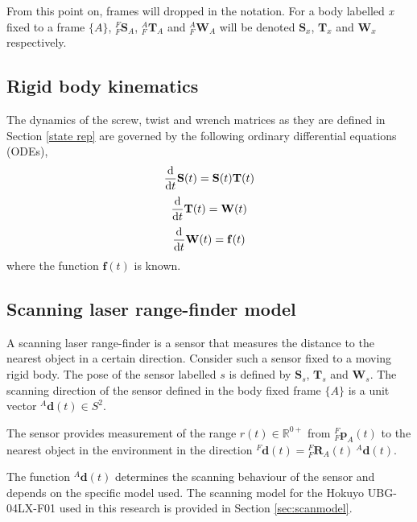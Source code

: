 		From this point on, frames will dropped in the notation. For a body labelled \textit{x} fixed to a frame $\{A\}$, ${^{F}_{F}\mathbf{S}^{}_{A}}$, ${^{A}_{F}\mathbf{T}^{}_{A}}$ and ${^{A}_{F}\mathbf{W}^{}_{A}}$ will be denoted $\mathbf{S}_x$, $\mathbf{T}_x$ and $\mathbf{W}_x$ respectively.
						
	\subsection{Rigid body kinematics} \label{kinematics}
		The dynamics of the screw, twist and wrench matrices as they are defined in Section \ref{state rep} are governed by the following ordinary differential equations (ODEs),
		\begin{equation}
			{\frac{\textnormal{d}}{\textnormal{d}t}} \mathbf{S}(t) =\mathbf{S}(t)\mathbf{T}(t)
		\end{equation}		
		\begin{equation}
			{\frac{\textnormal{d}}{\textnormal{d}t}} \mathbf{T}(t) = \mathbf{W}(t)
		\end{equation}		
		\begin{equation}
			{\frac{\textnormal{d}}{\textnormal{d}t}} \mathbf{W}(t)=\mathbf{f}(t)			
		\end{equation}
		where the function $\mathbf{f}(t)$ is known.
	
	\subsection{Scanning laser range-finder model}
		A scanning laser range-finder is a sensor that measures the distance to the nearest object in a certain direction. Consider such a sensor fixed to a moving rigid body. The pose of the sensor labelled $s$ is defined by $\mathbf{S}_s$, $\mathbf{T}_s$ and $\mathbf{W}_s$. The scanning direction of the sensor defined in the body fixed frame $\{A\}$ is a unit vector ${^{A}\mathbf{d}(t)} \in S^2$.	
		
		The sensor provides measurement of the range $r(t) \in \mathbb{R}^{0+}$ from $^{F}_{F}\mathbf{p}^{}_{A}(t)$ to the nearest object in the environment in the direction ${^{F}\mathbf{d}(t)} = {^{F}_{F}\mathbf{R}^{}_{A}(t)}\:{^{A}\mathbf{d}(t)}$.
		
		The function ${^{A}\mathbf{d}(t)}$ determines the scanning behaviour of the sensor and depends on the specific model used. The scanning model for the Hokuyo UBG-04LX-F01 used in this research is provided in Section \ref{sec:scanmodel}.
		
